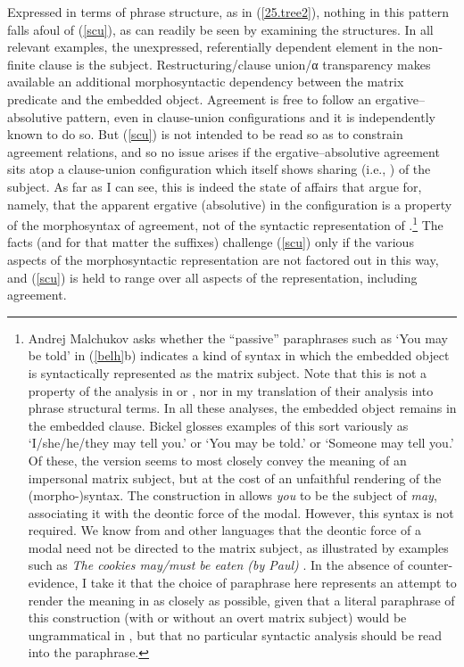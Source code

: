 \documentclass[output=paper]{langsci/langscibook}
\begin{document}
Expressed in terms of phrase structure, as in (\ref{25.tree2}), nothing in this
pattern falls afoul of (\ref{scu}), as can readily be seen by examining the
structures. In all relevant examples, the unexpressed, referentially dependent
element in the non-finite clause is the subject. Restructuring/clause union/α
transparency makes available an additional morphosyntactic dependency between
the matrix predicate and the embedded object. Agreement is free to follow an
ergative--absolutive pattern, even in clause-union configurations and it is
independently known to do so. But (\ref{scu}) is not intended to be read so as
to constrain agreement relations, and so no issue arises if the
ergative--absolutive agreement sits atop a clause-union configuration which
itself shows sharing (i.e., ) of the subject. As far as I can see, this
is indeed the state of affairs that \citet{bicknich01} argue for, namely, that
the apparent ergative (absolutive)  in the  
configuration is a property of the morphosyntax of agreement, not of the
syntactic representation of .\footnote{Andrej Malchukov asks whether the
    ``passive'' paraphrases such as `You may be told' in (\ref{belh}b)
    indicates a kind of  syntax in which the embedded object is
    syntactically represented as the matrix subject. Note that this is not a
    property of the analysis in \citet{bicknich01} or \citet{bickel04}, nor in
    my translation of their analysis into phrase structural terms. In all these
    analyses, the embedded object remains in the embedded clause. Bickel
    glosses examples of this sort variously as `I/she/he/they may tell you.' or
    `You may be told.' or `Someone may tell you.' Of these, the  version
    seems to most closely convey the meaning of an impersonal matrix subject,
    but at the cost of an unfaithful rendering of the  (morpho-)syntax.
    The  construction in  allows \emph{you} to be the subject of
    \emph{may}, associating it with the deontic force of the modal. However,
    this syntax is not required. We know from  and other languages that
    the deontic force of a modal need not be directed to the matrix subject, as
    illustrated by examples such as \emph{The cookies may/must be eaten (by
    Paul)} \citep{warner93,wurmbrand99}. In the absence of counter-evidence, I
    take it that the choice of paraphrase here represents an attempt to render
    the meaning in  as closely as possible, given that a literal
    paraphrase of this construction (with or without an overt matrix subject)
would be ungrammatical in , but that no particular syntactic analysis
should be read into the paraphrase.} The  facts (and for that matter the
 suffixes) challenge (\ref{scu}) only if the various aspects of the
morphosyntactic representation are not factored out in this way, and
(\ref{scu}) is held to range over all aspects of the representation, including
agreement.
\end{document}

